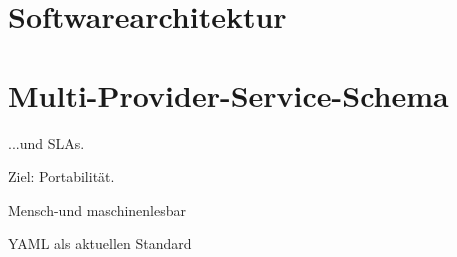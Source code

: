 


\section{Softwarearchitektur}

%


\section{Multi-Provider-Service-Schema}




...und SLAs.

Ziel: Portabilität.

Mensch-und maschinenlesbar

YAML als aktuellen Standard

